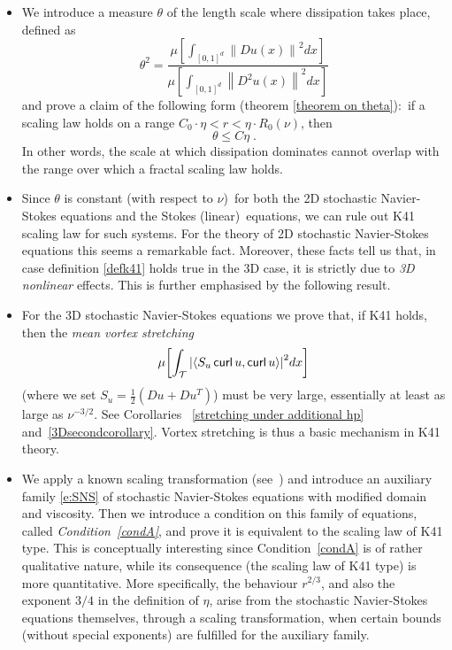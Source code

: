 \documentclass[11pt]{preprint}
\DeclareMathOperator{\Curl}{\mathsf{curl}}
\begin{document}
\begin{itemize}
\item  We introduce a measure $\theta$ of the length scale where dissipation
takes place, defined as
\begin{equation}
\theta^{2}=\frac{\mu\left[  \int_{\left[  0,1\right]  ^{d}}\left\|  Du\left(
x\right)  \right\|  ^{2}dx\right]  }{\mu\left[  \int_{\left[  0,1\right]
^{d}}\left\|  D^{2}u\left(  x\right)  \right\|  ^{2}dx\right]  }\label{theta}%
\end{equation}
and prove a claim of the following form (theorem \ref{theorem on theta}):\ if
a scaling law holds on a range $C_{0}\cdot\eta<r<\eta\cdot R_{0}\left(
\nu\right)  $, then
\[
\theta\leq C\eta\;.
\]
In other words, the scale at which dissipation dominates cannot overlap with the range
over which a fractal scaling law holds.

\item  Since $\theta$ is constant (with respect to $\nu$)\ for both the 2D
stochastic Navier-Stokes equations and the Stokes (linear)\ equations, we can rule
out K41 scaling law for such systems. For the theory of 2D stochastic
Navier-Stokes equations this seems a remarkable fact. Moreover, these facts
tell us that, in case definition \ref{defk41} holds true in the 3D case, it is
strictly due to \textit{3D nonlinear} effects. This is further emphasised by
the following result.

\item  For the 3D stochastic Navier-Stokes equations we prove that, if K41
holds, then the \textit{mean vortex stretching}
\[
\mu\left[  \int_{\mathcal{T}}\left|\scal{S_{u}\Curl u,\Curl %
u}\right|  ^{2}dx\right]
\]
(where we set $S_{u}=\frac{1}{2}(  Du+Du^{T})  $) must be very large,
essentially at least as large as $\nu^{-3/2}$. See Corollaries~
\ref{stretching under additional hp} and~\ref{3Dsecondcorollary}. Vortex stretching is thus a
basic mechanism in K41 theory.

\item  We apply a known scaling transformation (see~\cite{Kup}) and introduce
an auxiliary family \ref{e:SNS} of stochastic Navier-Stokes equations with
modified domain and viscosity. Then we introduce a condition on this family of
equations, called \textit{Condition~\ref{condA}}, and prove it is equivalent to the
scaling law of K41 type. This is conceptually interesting since Condition~\ref{condA}
is of rather qualitative nature, while its consequence (the scaling law of K41
type) is more quantitative. More specifically, the behaviour $r^{2/3}$, and
also the exponent $3/4$ in the definition of $\eta$, arise from the stochastic
Navier-Stokes equations themselves, through a scaling transformation, when
certain bounds (without special exponents) are fulfilled for the auxiliary family.


\end{itemize}
\end{document}

